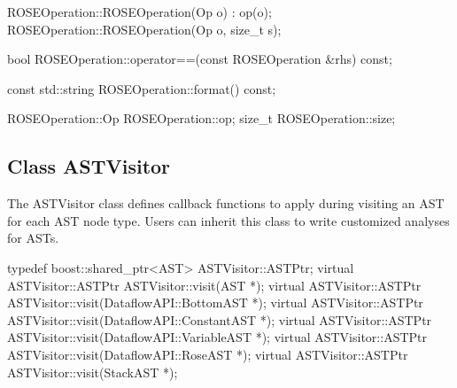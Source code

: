 \begin{apient}
ROSEOperation::ROSEOperation(Op o) : op(o);
ROSEOperation::ROSEOperation(Op o, size_t s);
\end{apient}

\begin{apient}
bool ROSEOperation::operator==(const ROSEOperation &rhs) const;
\end{apient}

\begin{apient}
const std::string ROSEOperation::format() const;
\end{apient}

\begin{apient}
ROSEOperation::Op ROSEOperation::op;
size_t ROSEOperation::size;
\end{apient}

\subsection{Class ASTVisitor}

The ASTVisitor class defines callback functions to apply during visiting an AST for
each AST node type. Users can inherit this class to write customized analyses
for ASTs.

\begin{apient}
typedef boost::shared_ptr<AST> ASTVisitor::ASTPtr;
virtual ASTVisitor::ASTPtr ASTVisitor::visit(AST *);
virtual ASTVisitor::ASTPtr ASTVisitor::visit(DataflowAPI::BottomAST *);
virtual ASTVisitor::ASTPtr ASTVisitor::visit(DataflowAPI::ConstantAST *);
virtual ASTVisitor::ASTPtr ASTVisitor::visit(DataflowAPI::VariableAST *);
virtual ASTVisitor::ASTPtr ASTVisitor::visit(DataflowAPI::RoseAST *);
virtual ASTVisitor::ASTPtr ASTVisitor::visit(StackAST *);
\end{apient}

